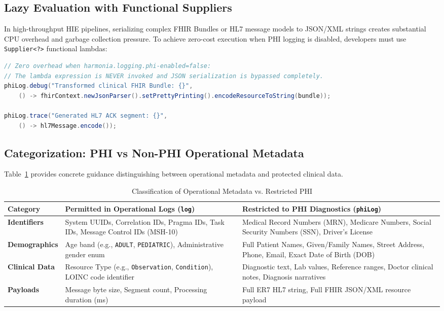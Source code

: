\subsection{Lazy Evaluation with Functional Suppliers}

In high-throughput HIE pipelines, serializing complex FHIR Bundles or HL7 message models to JSON/XML strings creates substantial CPU overhead and garbage collection pressure. To achieve zero-cost execution when PHI logging is disabled, developers must use \texttt{Supplier<?>} functional lambdas:

\begin{lstlisting}[language=Java, caption={Lazy Evaluation Using Functional Suppliers}]
// Zero overhead when harmonia.logging.phi-enabled=false:
// The lambda expression is NEVER invoked and JSON serialization is bypassed completely.
phiLog.debug("Transformed clinical FHIR Bundle: {}", 
    () -> fhirContext.newJsonParser().setPrettyPrinting().encodeResourceToString(bundle));

phiLog.trace("Generated HL7 ACK segment: {}", 
    () -> hl7Message.encode());
\end{lstlisting}

\subsection{Categorization: PHI vs Non-PHI Operational Metadata}

Table~\ref{tab:phi_data_classification} provides concrete guidance distinguishing between operational metadata and protected clinical data.

\begin{table}[htbp]
\centering
\small
\begin{tabularx}{\textwidth}{p{4.5cm} X X}
\toprule
\textbf{Category} & \textbf{Permitted in Operational Logs (\texttt{log})} & \textbf{Restricted to PHI Diagnostics (\texttt{phiLog})} \\
\midrule
\textbf{Identifiers} & System UUIDs, Correlation IDs, Pragma IDs, Task IDs, Message Control IDs (MSH-10) & Medical Record Numbers (MRN), Medicare Numbers, Social Security Numbers (SSN), Driver's License \\
\addlinespace
\textbf{Demographics} & Age band (e.g., \texttt{ADULT}, \texttt{PEDIATRIC}), Administrative gender enum & Full Patient Names, Given/Family Names, Street Address, Phone, Email, Exact Date of Birth (DOB) \\
\addlinespace
\textbf{Clinical Data} & Resource Type (e.g., \texttt{Observation}, \texttt{Condition}), LOINC code identifier & Diagnostic text, Lab values, Reference ranges, Doctor clinical notes, Diagnosis narratives \\
\addlinespace
\textbf{Payloads} & Message byte size, Segment count, Processing duration (ms) & Full ER7 HL7 string, Full FHIR JSON/XML resource payload \\
\bottomrule
\end{tabularx}
\caption{Classification of Operational Metadata vs. Restricted PHI}
\label{tab:phi_data_classification}
\end{table}

